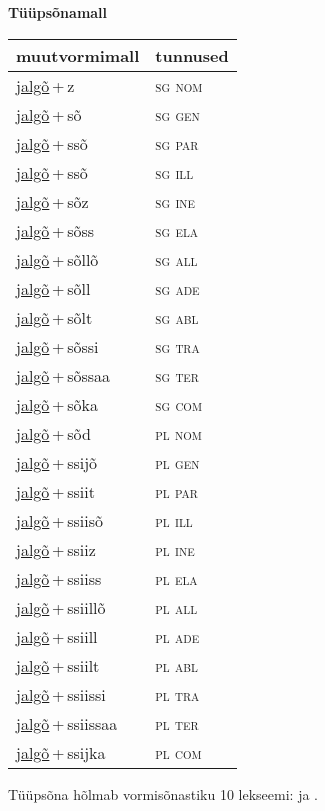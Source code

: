 
\vspace{1.8em}
\begin{minipage}{\textwidth}
\textbf{Tüüpsõnamall \,}\\

\begin{sideways}
\begin{tabular}{l l}
muutvormimall & tunnused \\
\hline
\underline{jalgõ}\,+\,z & \textsc{ sg nom } \\
\underline{jalgõ}\,+\,sõ & \textsc{ sg gen } \\
\underline{jalgõ}\,+\,ssõ & \textsc{ sg par } \\
\underline{jalgõ}\,+\,ssõ & \textsc{ sg ill } \\
\underline{jalgõ}\,+\,sõz & \textsc{ sg ine } \\
\underline{jalgõ}\,+\,sõss & \textsc{ sg ela } \\
\underline{jalgõ}\,+\,sõllõ & \textsc{ sg all } \\
\underline{jalgõ}\,+\,sõll & \textsc{ sg ade } \\
\underline{jalgõ}\,+\,sõlt & \textsc{ sg abl } \\
\underline{jalgõ}\,+\,sõssi & \textsc{ sg tra } \\
\underline{jalgõ}\,+\,sõssaa & \textsc{ sg ter } \\
\underline{jalgõ}\,+\,sõka & \textsc{ sg com } \\
\underline{jalgõ}\,+\,sõd & \textsc{ pl nom } \\
\underline{jalgõ}\,+\,ssijõ & \textsc{ pl gen } \\
\underline{jalgõ}\,+\,ssiit & \textsc{ pl par } \\
\underline{jalgõ}\,+\,ssiisõ & \textsc{ pl ill } \\
\underline{jalgõ}\,+\,ssiiz & \textsc{ pl ine } \\
\underline{jalgõ}\,+\,ssiiss & \textsc{ pl ela } \\
\underline{jalgõ}\,+\,ssiillõ & \textsc{ pl all } \\
\underline{jalgõ}\,+\,ssiill & \textsc{ pl ade } \\
\underline{jalgõ}\,+\,ssiilt & \textsc{ pl abl } \\
\underline{jalgõ}\,+\,ssiissi & \textsc{ pl tra } \\
\underline{jalgõ}\,+\,ssiissaa & \textsc{ pl ter } \\
\underline{jalgõ}\,+\,ssijka & \textsc{ pl com } \\
\end{tabular}
\end{sideways}
\label{tab:tüüpsõnamall-jalgõz}

\end{minipage}

 
\vspace{1em}
\noindent Tüüpsõna hõlmab vormisõnastiku 10 lekseemi:  ja .

